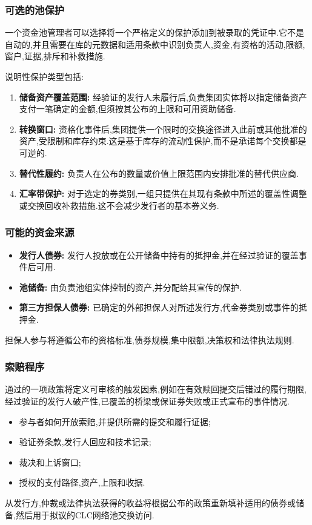 \documentclass[11pt]{article}
\begin{document}
\subsubsection*{可选的池保护}

一个资金池管理者可以选择将一个严格定义的保护添加到被录取的凭证中.它不是自动的,并且需要在库的元数据和适用条款中识别负责人,资金,有资格的活动,限额,窗户,证据,排斥和补救措施.

说明性保护类型包括:

\begin{enumerate}[leftmargin=*]
\item \textbf{储备资产覆盖范围:} 经验证的发行人未履行后,负责集团实体将以指定储备资产支付一笔确定的金额,但须按其公布的上限和可用资助储备.
\item \textbf{转换窗口:} 资格化事件后,集团提供一个限时的交换途径进入此前或其他批准的资产,受限制和库存约束.这是基于库存的流动性保护,而不是承诺每个交换都是可逆的.
\item \textbf{替代性履约:} 负责人在公布的数量或价值上限范围内安排批准的替代供应商.
\item \textbf{汇率带保护:} 对于选定的券类别,一组只提供在其现有条款中所述的覆盖性调整或交换回收补救措施.这不会减少发行者的基本券义务.
\end{enumerate}
\subsubsection*{可能的资金来源}

\begin{itemize}[leftmargin=*]
\item \textbf{发行人债券:} 发行人投放或在公开储备中持有的抵押金,并在经过验证的覆盖事件后可用.
\item \textbf{池储备:} 由负责池组实体控制的资产,并分配给其宣传的保护.
\item \textbf{第三方担保人债券:} 已确定的外部担保人对所述发行方,代金券类别或事件的抵押金.
\end{itemize}
担保人参与将遵循公布的资格标准,债券规模,集中限额,决策权和法律执法规则.

\subsubsection*{索赔程序}

通过的一项政策将定义可审核的触发因素,例如在有效赎回提交后错过的履行期限,经过验证的发行人破产性,已覆盖的桥梁或保证券失败或正式宣布的事件情况.

\begin{itemize}[leftmargin=*]
\item 参与者如何开放索赔,并提供所需的提交和履行证据;
\item 验证券条款,发行人回应和技术记录;
\item 裁决和上诉窗口;
\item 授权的支付路径,资产,上限和收据.
\end{itemize}
从发行方,仲裁或法律执法获得的收益将根据公布的政策重新填补适用的债券或储备,然后用于拟议的CLC网络池交换访问.
\end{document}
